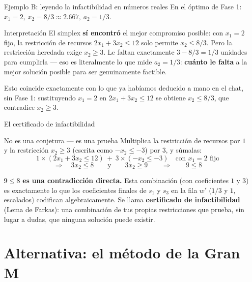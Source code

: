 \documentclass[aspectratio=169]{beamer}
\begin{document}
\begin{frame}{Ejemplo B: leyendo la infactibilidad en números reales}
En el óptimo de Fase 1: $x_1=2,\ x_2=8/3\approx2.667,\ a_2=1/3$.

\begin{block}{Interpretación}
El simplex \textbf{sí encontró} el mejor compromiso posible: con $x_1=2$ fijo, la restricción de recursos $2x_1+3x_2\leq12$ solo permite $x_2\leq8/3$. Pero la restricción heredada exige $x_2\geq3$. Le faltan exactamente $3-8/3=1/3$ unidades para cumplirla --- eso es literalmente lo que mide $a_2=1/3$: \textbf{cuánto le falta} a la mejor solución posible para ser genuinamente factible.
\end{block}

Esto coincide exactamente con lo que ya habíamos deducido a mano en el chat, sin Fase 1: sustituyendo $x_1=2$ en $2x_1+3x_2\leq12$ se obtiene $x_2\leq8/3$, que contradice $x_2\geq3$.
\end{frame}

\begin{frame}{El certificado de infactibilidad}
\begin{block}{No es una conjetura --- es una prueba}
Multiplica la restricción de recursos por $1$ y la restricción $x_2\geq3$ (escrita como $-x_2\leq-3$) por $3$, y súmalas:
\[
1\times(2x_1+3x_2\leq12) \ + \ 3\times(-x_2\leq-3) \quad\text{con } x_1=2 \text{ fijo}
\]
\[
\Rightarrow\quad 3x_2\leq8 \qquad\text{y}\qquad 3x_2\geq9 \qquad\Rightarrow\qquad 9\leq8
\]
\end{block}

\textbf{$9\leq8$ es una contradicción directa.} Esta combinación (con coeficientes $1$ y $3$) es exactamente lo que los coeficientes finales de $s_1$ y $s_3$ en la fila $w'$ ($1/3$ y $1$, escalados) codifican algebraicamente. Se llama \textbf{certificado de infactibilidad} (Lema de Farkas): una combinación de tus propias restricciones que prueba, sin lugar a dudas, que ninguna solución puede existir.
\end{frame}

\section{Alternativa: el método de la Gran M}
\end{document}
